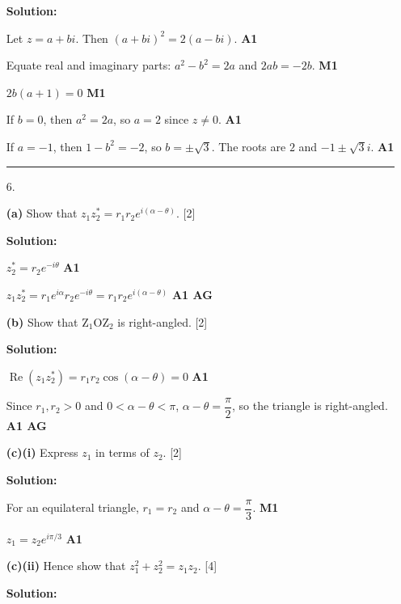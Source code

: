 \documentclass[12pt, twoside]{article}
\begin{document}
\begin{enumerate}[itemsep=0.3cm]
\textbf{Solution:}

Let $z = a + bi$. Then $(a + bi)^2 = 2(a - bi)$. \hfill \textbf{A1}

Equate real and imaginary parts:
$a^2 - b^2 = 2a$ and $2ab = -2b$. \hfill \textbf{M1}

$2b(a + 1) = 0$ \hfill \textbf{M1}

If $b = 0$, then $a^2 = 2a$, so $a = 2$ since $z \neq 0$. \hfill \textbf{A1}

If $a = -1$, then $1 - b^2 = -2$, so $b = \pm\sqrt{3}$.
The roots are $2$ and $-1 \pm \sqrt{3}i$. \hfill \textbf{A1}

\bigskip
\hrule
\bigskip

\item[6.] 

\textbf{(a)} Show that $z_1z_2^{*} = r_1r_2e^{i(\alpha-\theta)}$. \hfill [2]

\textbf{Solution:}

$z_2^{*} = r_2e^{-i\theta}$ \hfill \textbf{A1}

$z_1z_2^{*} = r_1e^{i\alpha}r_2e^{-i\theta}
= r_1r_2e^{i(\alpha-\theta)}$ \hfill \textbf{A1 AG}

\medskip

\textbf{(b)} Show that $\mathrm{Z}_1\mathrm{OZ}_2$ is right-angled. \hfill [2]

\textbf{Solution:}

$\operatorname{Re}(z_1z_2^{*}) = r_1r_2\cos(\alpha-\theta) = 0$ \hfill \textbf{A1}

Since $r_1, r_2 > 0$ and $0 < \alpha-\theta < \pi$,
$\alpha-\theta = \dfrac{\pi}{2}$, so the triangle is right-angled. \hfill \textbf{A1 AG}

\medskip

\textbf{(c)(i)} Express $z_1$ in terms of $z_2$. \hfill [2]

\textbf{Solution:}

For an equilateral triangle, $r_1 = r_2$ and $\alpha-\theta = \dfrac{\pi}{3}$. \hfill \textbf{M1}

$z_1 = z_2e^{i\pi/3}$ \hfill \textbf{A1}

\medskip

\textbf{(c)(ii)} Hence show that $z_1^2 + z_2^2 = z_1z_2$. \hfill [4]

\textbf{Solution:}


\end{enumerate}
\end{document}

